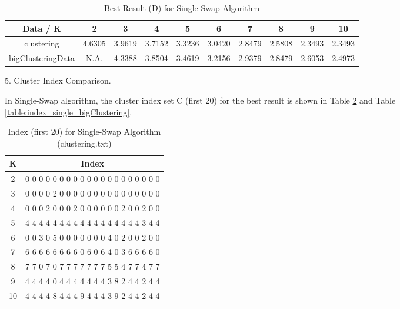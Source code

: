 \begin{description}
\begin{description}
\begin{table}[H]
	\centering
	\caption{Best Result (D) for Single-Swap Algorithm}
	\label{table:best_single}	
	\begin{tabular}{ c | c | c | c | c | c | c | c | c | c}
		\hline \hline
		Data / K      & 2     &    3    & 4    & 5     & 6    & 7    & 8   & 9    & 10 \\[0.1cm]
		\hline
	clustering	        & 4.6305 &    3.9619 & 3.7152 & 3.3236 & 3.0420 & 2.8479 & 2.5808 & 2.3493 & 2.3493 \\[0.1cm]
bigClusteringData & N.A. &    4.3388 & 3.8504 & 3.4619 & 3.2156 & 2.9379 & 2.8479 & 2.6053 & 2.4973 \\[0.1cm]
		\hline	
	\end{tabular}
\end{table}

\item{5.} Cluster Index Comparison.

In Single-Swap algorithm, the cluster index set C (first 20) for the best result is shown in Table \ref{table:index_single_clustering} and Table \ref{table:index_single_bigClustering}.

\begin{table}[H]
	\centering
	\caption{Index (first 20) for Single-Swap Algorithm (clustering.txt)}
	\label{table:index_single_clustering}	
	\begin{tabular}{ c | c }
		\hline \hline
		K        &    Index  \\[0.1cm]
		\hline
		2   & 0 0 0 0 0 0 0 0 0 0 0 0 0 0 0 0 0 0 0 0 \\[0.1cm]
	    3   & 0 0 0 0 2 0 0 0 0 0 0 0 0 0 0 0 0 0 0 0 \\[0.1cm]
        4   & 0 0 0 2 0 0 0 2 0 0 0 0 0 0 2 0 0 2 0 0 \\[0.1cm]
        5   & 4 4 4 4 4 4 4 4 4 4 4 4 4 4 4 4 4 3 4 4 \\[0.1cm]
        6   & 0 0 3 0 5 0 0 0 0 0 0 0 4 0 2 0 0 2 0 0 \\[0.1cm]
        7   & 6 6 6 6 6 6 6 6 0 6 0 6 4 0 3 6 6 6 6 0 \\[0.1cm]
        8   & 7 7 0 7 0 7 7 7 7 7 7 7 5 5 4 7 7 4 7 7 \\[0.1cm]
        9   & 4 4 4 4 0 4 4 4 4 4 4 4 3 8 2 4 4 2 4 4 \\[0.1cm]
        10 & 4 4 4 4 8 4 4 4 9 4 4 4 3 9 2 4 4 2 4 4 \\[0.1cm]
		\hline	
	\end{tabular}
\end{table}


\end{description}
\end{description}
